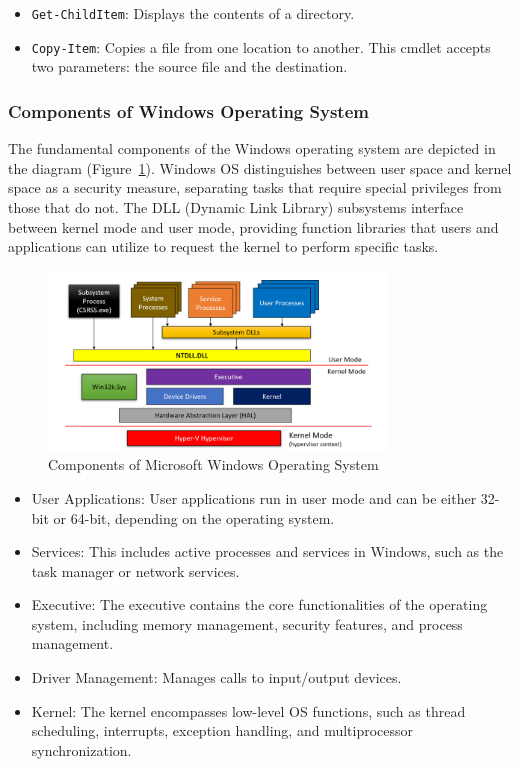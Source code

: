 \begin{itemize}
    \item \texttt{Get-ChildItem}: Displays the contents of a directory.
    \item \texttt{Copy-Item}: Copies a file from one location to another. This cmdlet accepts two parameters: the source file and the destination.
\end{itemize}

\subsubsection{Components of Windows Operating System}
The fundamental components of the Windows operating system are depicted in the diagram (Figure~\ref{fig:components}). Windows OS distinguishes between user space and kernel space as a security measure, separating tasks that require special privileges from those that do not. The DLL (Dynamic Link Library) subsystems interface between kernel mode and user mode, providing function libraries that users and applications can utilize to request the kernel to perform specific tasks.

\begin{figure}[h!]
\centering
\includegraphics[width=0.8\textwidth]{images/user_kernel.png}
\caption{Components of Microsoft Windows Operating System}
\label{fig:components}
\end{figure}

\begin{itemize}
    \item User Applications: User applications run in user mode and can be either 32-bit or 64-bit, depending on the operating system.
    \item Services: This includes active processes and services in Windows, such as the task manager or network services.
    \item Executive: The executive contains the core functionalities of the operating system, including memory management, security features, and process management.
    \item Driver Management: Manages calls to input/output devices.
    \item Kernel: The kernel encompasses low-level OS functions, such as thread scheduling, interrupts, exception handling, and multiprocessor synchronization.
\end{itemize}



